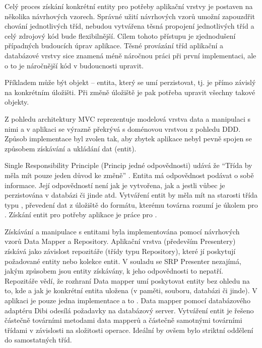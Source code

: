 Celý proces získání konkrétní entity pro potřeby aplikační vrstvy je postaven na několika návrhových vzorech. Správné užití návrhových vzorů umožní zapouzdřit chování jednotlivých tříd, nebudou vytvářena těsná propojení jednotlivých tříd a celý zdrojový kód bude flexibilnější. Cílem tohoto přístupu je zjednodušení případných budoucích úprav aplikace. Těsné provázání tříd aplikační a databázové vrstvy sice znamená méně náročnou práci při první implementaci, ale o to je náročnější kód v budoucnosti upravit. 

Příkladem může být objekt -- entita, který se umí perzistovat, tj. je přímo závislý na konkrétním úložišti. Při změně úložiště je pak potřeba upravit všechny takové objekty.

Z pohledu architektury MVC reprezentuje modelová vrstva data a manipulaci s nimi a v aplikaci se výrazně překrývá s doménovou vrstvou z pohledu DDD. Způsob implementace byl zvolen tak, aby zbytek aplikace nebyl pevně spojen se způsobem získávání a ukládání dat (entit).

Single Responsibility Principle (Princip jedné odpovědnosti) udává že ``Třída by měla mít pouze jeden důvod ke změně'' . Entita má odpovědnost podávat o sobě informace. Její odpovědností není jak je vytvořena, jak a jestli vůbec je perzistována v databázi či jinde atd. Vytváření entit by měla mít na starosti třída typu , převedení dat z úložiště do formátu, kterému továrna rozumí je úkolem pro . Získání entit pro potřeby aplikace je práce pro . 

Získávání a manipulace s entitami byla implementována pomocí návrhových vzorů Data Mapper a Repository. Aplikační vrstva (především Presentery) získává jako závislost repozitáře (třídy typu Repository), které jí poskytují požadované entity nebo kolekce entit. V souladu se SRP Presenter nezajímá, jakým způsobem jsou entity získávány, k jeho odpovědnosti to nepatří. Repozitáře vědí, že rozhraní Data mapper umí poskytovat entity bez ohledu na to, kde a jak je konkrétní entita uložena (v paměti, souboru, databázi či jinde). V aplikaci je pouze jedna implementace a to . Data mapper pomocí databázového adaptéru Dibi odesílá požadavky na databázový server. Vytváření entit je řešeno částečně továrními metodami data mapperů a částečně samotnými továrními třídami v závislosti na složitosti operace. Ideální by ovšem bylo striktní oddělení do samostatných tříd.
\clearpage


